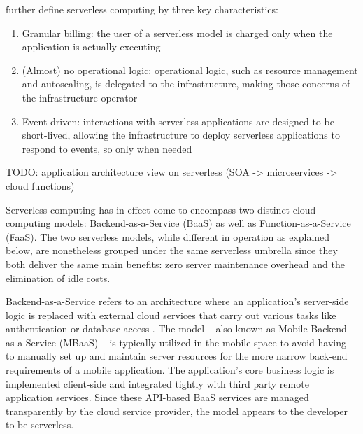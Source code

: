 \documentclass[utf8,english]{gradu3}
\begin{document}
\textcite{van2017spec} further define serverless computing by three key characteristics: \begin{enumerate}
  \item Granular billing: the user of a serverless model is charged only when the application is actually executing
  \item (Almost) no operational logic: operational logic, such as resource management and autoscaling, is delegated to the infrastructure, making those concerns of the infrastructure operator
  \item Event-driven: interactions with serverless applications are designed to be short-lived, allowing the infrastructure to deploy serverless applications to respond to events, so only when needed
\end{enumerate}

TODO: application architecture view on serverless (SOA -> microservices -> cloud functions)

Serverless computing has in effect come to encompass two distinct cloud computing models: Backend-as-a-Service (BaaS) as well as Function-as-a-Service (FaaS). The two serverless models, while different in operation as explained below, are nonetheless grouped under the same serverless umbrella since they both deliver the same main benefits: zero server maintenance overhead and the elimination of idle costs. \parencite{cncf18serverlessWG}

Backend-as-a-Service refers to an architecture where an application's server-side logic is replaced with external cloud services that carry out various tasks like authentication or database access \parencite{buyya2017manifesto}. The model -- also known as Mobile-Backend-as-a-Service (MBaaS) \parencite{sareen13cloudTypes} -- is typically utilized in the mobile space to avoid having to manually set up and maintain server resources for the more narrow back-end requirements of a mobile application. The application's core business logic is implemented client-side and integrated tightly with third party remote application services. Since these API-based BaaS services are managed transparently by the cloud service provider, the model appears to the developer to be serverless.
\end{document}
